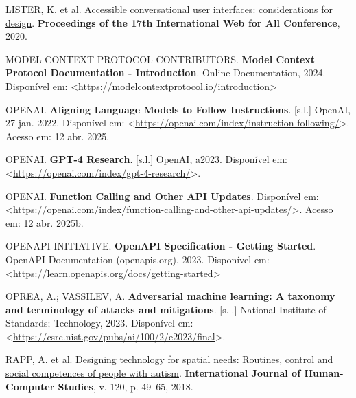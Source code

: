 \documentclass[
]{article}
\newlength{\cslhangindent}
\newenvironment{CSLReferences}[2] %
 {\begin{list}{}{%
  \setlength{\itemindent}{0pt}
  \setlength{\leftmargin}{0pt}
  \setlength{\parsep}{0pt}
  \ifodd #1
   \setlength{\leftmargin}{\cslhangindent}
   \setlength{\itemindent}{-1\cslhangindent}
  \fi
  \setlength{\itemsep}{#2\baselineskip}}}
 {\end{list}}
\begin{document}
\begin{CSLReferences}{0}{1}
LISTER, K. et al.
\href{https://api.semanticscholar.org/CorpusID:218539971}{Accessible
conversational user interfaces: considerations for design}.
\textbf{Proceedings of the 17th International Web for All Conference},
2020.

MODEL CONTEXT PROTOCOL CONTRIBUTORS. \textbf{{Model Context Protocol
Documentation - Introduction}}. Online Documentation, 2024. Disponível
em:
\textless{}\url{https://modelcontextprotocol.io/introduction}\textgreater{}

OPENAI. \textbf{Aligning Language Models to Follow Instructions}.
{[}s.l.{]} OpenAI, 27 jan. 2022. Disponível em:
\textless{}\url{https://openai.com/index/instruction-following/}\textgreater.
Acesso em: 12 abr. 2025.

OPENAI. \textbf{GPT-4 Research}. {[}s.l.{]} OpenAI, a2023. Disponível
em:
\textless{}\url{https://openai.com/index/gpt-4-research/}\textgreater.

OPENAI. \textbf{Function Calling and Other API Updates}. Disponível em:
\textless{}\url{https://openai.com/index/function-calling-and-other-api-updates/}\textgreater.
Acesso em: 12 abr. 2025b.

OPENAPI INITIATIVE. \textbf{{OpenAPI Specification - Getting Started}}.
OpenAPI Documentation (openapis.org), 2023. Disponível em:
\textless{}\url{https://learn.openapis.org/docs/getting-started}\textgreater{}

OPREA, A.; VASSILEV, A. \textbf{Adversarial machine learning: A taxonomy
and terminology of attacks and mitigations}. {[}s.l.{]} National
Institute of Standards; Technology, 2023. Disponível em:
\textless{}\url{https://csrc.nist.gov/pubs/ai/100/2/e2023/final}\textgreater.

RAPP, A. et al.
\href{https://doi.org/10.1016/j.ijhcs.2018.07.005}{Designing technology
for spatial needs: Routines, control and social competences of people
with autism}. \textbf{International Journal of Human-Computer Studies},
v. 120, p. 49--65, 2018.

\end{CSLReferences}
\end{document}
